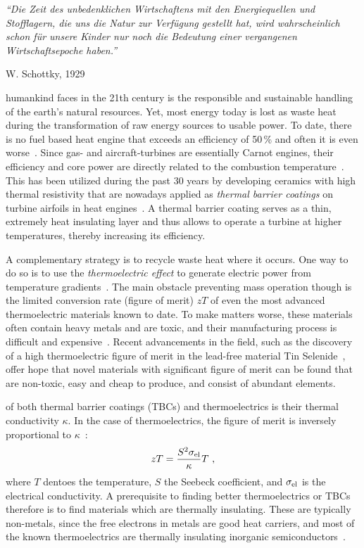 \epigraph{\singlespacing \it ``Die Zeit des unbedenklichen Wirtschaftens mit den Energiequellen und Stofflagern, die uns die Natur zur Verfügung gestellt hat, wird wahrscheinlich schon für unsere Kinder nur noch die Bedeutung einer vergangenen Wirtschaftsepoche haben.''}{W. Schottky, 1929~\cite{Schottky1929}}
 humankind faces in the 21th century is the responsible and sustainable handling of the earth's natural resources.  Yet, most energy today is lost as waste heat during the transformation of raw energy sources to usable power. To date, there is no fuel based heat engine that exceeds an efficiency of 50\,\% and often it is even worse~\cite{eia}. 
Since gas- and aircraft-turbines are essentially Carnot engines, their efficiency and core power are directly related to the combustion temperature~\cite{Clarke2012,Perepezko2009}. This has been utilized during the past 30 years by developing 
ceramics with high thermal resistivity that are nowadays applied as \emph{thermal barrier coatings} on turbine airfoils in heat engines~\cite{Clarke2003}. A thermal barrier coating serves as a thin, extremely heat insulating layer and thus allows to operate a turbine at higher temperatures, thereby increasing its efficiency.

A complementary strategy is to recycle waste heat where it occurs. One way to do so is to use the
\emph{thermoelectric effect} to  generate electric power from temperature gradients~\cite{Snyder2008}. The main obstacle preventing mass operation though is the limited conversion rate (figure of merit) $zT$ of even the most advanced thermoelectric materials known to date. To make matters worse, these materials often contain heavy metals and are toxic, and their manufacturing process is difficult and expensive~\cite{Nolas2001}. Recent advancements in the field, such as the discovery of a high thermoelectric figure of merit in the lead-free material Tin Selenide~\cite{Zhao2014}, offer hope that novel materials with significant figure of merit can be found that are non-toxic, easy and cheap to produce, and consist of abundant elements.

 of both thermal barrier coatings (TBCs) and thermoelectrics is their thermal conductivity $\kappa$. In the case of thermoelectrics, the figure of merit is inversely proportional to $\kappa$~\cite{Nolas2001}:
\begin{align}
zT = \frac{S^2 \sigma_{\rm el}}{\kappa} T~,
\label{eq:zT}
\end{align} 
where $T$ dentoes the temperature, $S$ the Seebeck coefficient, and $\sigma_{\rm el}$ is the electrical conductivity.
A prerequisite to finding better thermoelectrics or TBCs therefore is to find materials which are thermally insulating. These are typically non-metals, since the free electrons in metals are good heat carriers, and most of the known thermoelectrics are thermally insulating inorganic semiconductors~\cite[p.\,15]{Nolas2001}.

